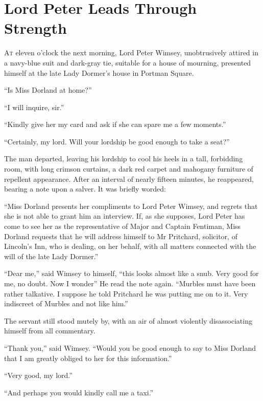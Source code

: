 \chapter{Lord Peter Leads Through Strength}

\lettrine[lines=4]{A}{t} eleven o'clock the next morning, Lord Peter Wimsey, unobtrusively attired in a navy-blue suit and dark-gray tie, suitable for a house of mourning, presented himself at the late Lady Dormer's house in Portman Square.

\enquote{Is Miss Dorland at home?}

\enquote{I will inquire, sir.}

\enquote{Kindly give her my card and ask if she can spare me a few moments.}

\enquote{Certainly, my lord. Will your lordship be good enough to take a seat?}

The man departed, leaving his lordship to cool his heels in a tall, forbidding room, with long crimson curtains, a dark red carpet and mahogany furniture of repellent appearance. After an interval of nearly fifteen minutes, he reappeared, bearing a note upon a salver. It was briefly worded:

\enquote{Miss Dorland presents her compliments to Lord Peter Wimsey, and regrets that she is not able to grant him an interview. If, as she supposes, Lord Peter has come to see her as the representative of Major and Captain Fentiman, Miss Dorland requests that he will address himself to Mr Pritchard, solicitor, of Lincoln's Inn, who is dealing, on her behalf, with all matters connected with the will of the late Lady Dormer.}

\enquote{Dear me,} said Wimsey to himself, \enquote{this looks almost like a snub. Very good for me, no doubt. Now I wonder\longdash} He read the note again. \enquote{Murbles must have been rather talkative. I suppose he told Pritchard he was putting me on to it. Very indiscreet of Murbles and not like him.}

The servant still stood mutely by, with an air of almost violently disassociating himself from all commentary.

\enquote{Thank you,} said Wimsey. \enquote{Would you be good enough to say to Miss Dorland that I am greatly obliged to her for this information.}

\enquote{Very good, my lord.}

\enquote{And perhaps you would kindly call me a taxi.}

